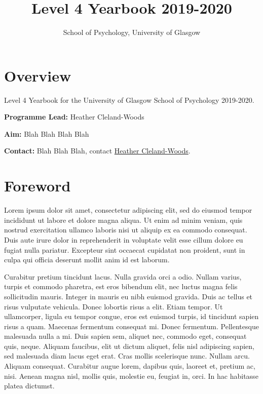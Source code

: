 \documentclass[]{book}
\title{Level 4 Yearbook 2019-2020}
\subtitle{School of Psychology, University of Glasgow}
\author{}
\date{}
\begin{document}
\maketitle

{
\setcounter{tocdepth}{1}
\tableofcontents
}
\hypertarget{overview}{%
\chapter*{Overview}\label{overview}}

Level 4 Yearbook for the University of Glasgow School of Psychology 2019-2020.

\textbf{Programme Lead:} Heather Cleland-Woods

\textbf{Aim:} Blah Blah Blah Blah

\textbf{Contact:} Blah Blah Blah, contact \href{mailto:heather.woods@glasgow.ac.uk}{Heather Cleland-Woods}.

\hypertarget{foreword}{%
\chapter*{Foreword}\label{foreword}}

Lorem ipsum dolor sit amet, consectetur adipiscing elit, sed do eiusmod tempor incididunt ut labore et dolore magna aliqua. Ut enim ad minim veniam, quis nostrud exercitation ullamco laboris nisi ut aliquip ex ea commodo consequat. Duis aute irure dolor in reprehenderit in voluptate velit esse cillum dolore eu fugiat nulla pariatur. Excepteur sint occaecat cupidatat non proident, sunt in culpa qui officia deserunt mollit anim id est laborum.

Curabitur pretium tincidunt lacus. Nulla gravida orci a odio. Nullam varius, turpis et commodo pharetra, est eros bibendum elit, nec luctus magna felis sollicitudin mauris. Integer in mauris eu nibh euismod gravida. Duis ac tellus et risus vulputate vehicula. Donec lobortis risus a elit. Etiam tempor. Ut ullamcorper, ligula eu tempor congue, eros est euismod turpis, id tincidunt sapien risus a quam. Maecenas fermentum consequat mi. Donec fermentum. Pellentesque malesuada nulla a mi. Duis sapien sem, aliquet nec, commodo eget, consequat quis, neque. Aliquam faucibus, elit ut dictum aliquet, felis nisl adipiscing sapien, sed malesuada diam lacus eget erat. Cras mollis scelerisque nunc. Nullam arcu. Aliquam consequat. Curabitur augue lorem, dapibus quis, laoreet et, pretium ac, nisi. Aenean magna nisl, mollis quis, molestie eu, feugiat in, orci. In hac habitasse platea dictumst.
\end{document}

